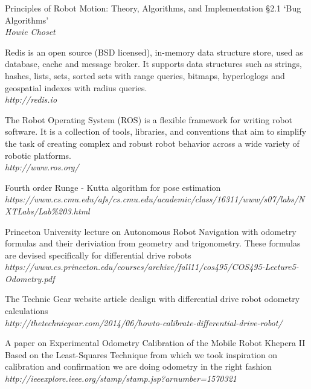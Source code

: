 \documentclass[11pt, a4paper]{article}
\begin{document}

\newpage
\begin{thebibliography}{9}

\par{Principles of Robot Motion: Theory, Algorithms, and Implementation \S2.1 `Bug Algorithms'}\\
\textit{Howie Choset}

\par{Redis is an open source (BSD licensed), in-memory data structure store, used as database, cache and message broker. It supports data structures such as strings, hashes, lists, sets, sorted sets with range queries, bitmaps, hyperloglogs and geospatial indexes with radius queries.}\\
\textit{http://redis.io}

\par{The Robot Operating System (ROS) is a flexible framework for writing robot software. It is a collection of tools, libraries, and conventions that aim to simplify the task of creating complex and robust robot behavior across a wide variety of robotic platforms.}\\
\textit{http://www.ros.org/}

\par{Fourth order Runge - Kutta algorithm for pose estimation} \\
\textit{https://www.cs.cmu.edu/afs/cs.cmu.edu/academic/class/16311/www/s07/labs/NXTLabs/Lab\%203.html}

\par{Princeton University lecture on Autonomous Robot Navigation with odometry formulas and their deriviation from geometry and trigonometry. These formulas are devised specifically for differential drive robots} \\
\textit{https://www.cs.princeton.edu/courses/archive/fall11/cos495/COS495-Lecture5-Odometry.pdf }

\par{The Technic Gear website article dealign with differential drive robot odometry calculations} \\
\textit{http://thetechnicgear.com/2014/06/howto-calibrate-differential-drive-robot/}

\par{A paper on Experimental Odometry Calibration of the Mobile Robot Khepera II Based on the Least-Squares Technique from which we took inspiration on calibration and confirmation we are doing odometry in the right fashion} \\
\textit{http://ieeexplore.ieee.org/stamp/stamp.jsp?arnumber=1570321}


\end{thebibliography}
\end{document}
